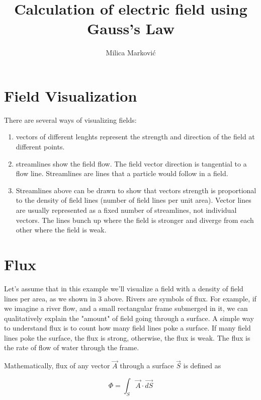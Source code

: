 \documentclass{ximera}
\title{Calculation of electric field using Gauss's Law}
\author{Milica Markovi\'c}
\begin{document}
  
\begin{abstract}  

\end{abstract}  
\maketitle    




\section{Field Visualization}

There are several ways of visualizing fields:
\begin{enumerate}
\item vectors of different lenghts represent the strength and direction of the field at different points. 
\item streamlines show the field flow. The field vector direction is tangential to a flow line. Streamlines are lines that a particle would follow in a field.
\item Streamlines above can be drawn to show that vectors strength is proportional to the density of field lines (number of field lines per unit area). Vector lines are usually represented as a fixed number of streamlines, not individual vectors. The lines bunch up where the field is stronger and diverge from each other where the field is weak.
\end{enumerate}

\section{Flux}

Let's assume that in this example we'll visualize a field with a density of field lines per area, as we shown in 3 above.  Rivers are symbols of flux. For example, if we imagine a river flow, and a small rectangular frame submerged in it, we can qualitatively explain the "amount" of field going through a surface.  A simple way to understand flux is to count how many field lines poke a surface.  If many field lines poke the surface, the flux is strong, otherwise, the flux is weak. The flux is the rate of flow of water through the frame.  


Mathematically, flux of any vector $\vec{A}$ through a surface $\vec{S}$ is defined as

\begin{equation}
\Phi=\int_S \vec{A} \cdot \vec{dS}
\end{equation}
\end{document}
